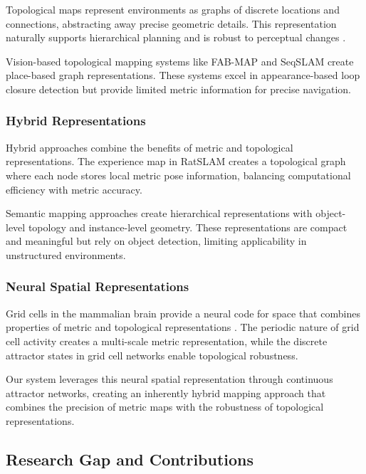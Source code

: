 Topological maps represent environments as graphs of discrete locations and connections, abstracting away precise geometric details.
This representation naturally supports hierarchical planning and is robust to perceptual changes \cite{Lowry2016}.

Vision-based topological mapping systems like FAB-MAP \cite{Cummins2008} and SeqSLAM \cite{Milford2012} create place-based graph representations.
These systems excel in appearance-based loop closure detection but provide limited metric information for precise navigation.

\subsubsection{Hybrid Representations}

Hybrid approaches combine the benefits of metric and topological representations.
The experience map in RatSLAM \cite{Milford2008} creates a topological graph where each node stores local metric pose information, balancing computational efficiency with metric accuracy.

Semantic mapping approaches \cite{Salas2013, McCormac2017} create hierarchical representations with object-level topology and instance-level geometry.
These representations are compact and meaningful but rely on object detection, limiting applicability in unstructured environments.

\subsubsection{Neural Spatial Representations}

Grid cells in the mammalian brain provide a neural code for space that combines properties of metric and topological representations \cite{Hafting2005, Moser2017}.
The periodic nature of grid cell activity creates a multi-scale metric representation, while the discrete attractor states in grid cell networks enable topological robustness.

Our system leverages this neural spatial representation through continuous attractor networks, creating an inherently hybrid mapping approach that combines the precision of metric maps with the robustness of topological representations.


\subsection{Research Gap and Contributions}


